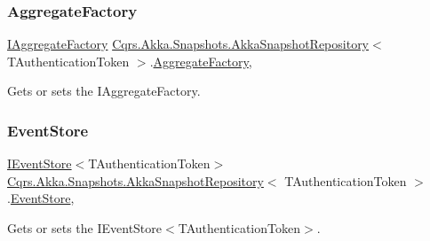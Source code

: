 \subsubsection{\texorpdfstring{Aggregate\+Factory}{AggregateFactory}}
{\footnotesize\ttfamily \hyperlink{interfaceCqrs_1_1Domain_1_1Factories_1_1IAggregateFactory}{I\+Aggregate\+Factory} \hyperlink{classCqrs_1_1Akka_1_1Snapshots_1_1AkkaSnapshotRepository}{Cqrs.\+Akka.\+Snapshots.\+Akka\+Snapshot\+Repository}$<$ T\+Authentication\+Token $>$.\hyperlink{classCqrs_1_1Domain_1_1Factories_1_1AggregateFactory}{Aggregate\+Factory}\hspace{0.3cm}{\ttfamily [get]}, {\ttfamily [protected]}}



Gets or sets the I\+Aggregate\+Factory. 

\mbox{\label{classCqrs_1_1Akka_1_1Snapshots_1_1AkkaSnapshotRepository_a72905e056029898df21f5644bce4ab69_a72905e056029898df21f5644bce4ab69}} 
\subsubsection{\texorpdfstring{Event\+Store}{EventStore}}
{\footnotesize\ttfamily \hyperlink{interfaceCqrs_1_1Events_1_1IEventStore}{I\+Event\+Store}$<$T\+Authentication\+Token$>$ \hyperlink{classCqrs_1_1Akka_1_1Snapshots_1_1AkkaSnapshotRepository}{Cqrs.\+Akka.\+Snapshots.\+Akka\+Snapshot\+Repository}$<$ T\+Authentication\+Token $>$.\hyperlink{classCqrs_1_1Events_1_1EventStore}{Event\+Store}\hspace{0.3cm}{\ttfamily [get]}, {\ttfamily [protected]}}



Gets or sets the I\+Event\+Store$<$\+T\+Authentication\+Token$>$. 

\mbox{\label{classCqrs_1_1Akka_1_1Snapshots_1_1AkkaSnapshotRepository_a4961f1b8481f1205c143172185bae3bb_a4961f1b8481f1205c143172185bae3bb}} 
